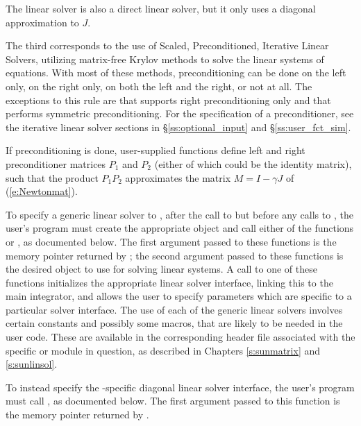 The {\cvdiag} linear solver is also a direct linear solver, but it
only uses a diagonal approximation to $J$.

The third corresponds to the use of Scaled, Preconditioned, Iterative
Linear Solvers, utilizing matrix-free Krylov methods to solve the
linear systems of equations.  With most of these methods,
preconditioning can be done on the left only, on the right only, on
both the left and the right, or not at all.  The exceptions to this
rule are {\spfgmr} that supports right preconditioning only and
{\pcg} that performs symmetric preconditioning.  For the specification
of a preconditioner, see the iterative linear solver sections
in \S\ref{ss:optional_input} and \S\ref{ss:user_fct_sim}.

If preconditioning is done, user-supplied functions define left and right
preconditioner matrices $P_1$ and $P_2$ (either of which could be the identity
matrix), such that the product $P_1 P_2$ approximates the matrix
$M = I - \gamma J$ of (\ref{e:Newtonmat}).

To specify a generic linear solver to {\cvode}, after the call to
 but before any calls to , the user's
program must create the appropriate {\sunlinsol} object and call
either of the functions  or
, as documented below.  The first argument
passed to these functions is the {\cvode} memory pointer returned by
; the second argument passed to these functions is the
desired {\sunlinsol} object to use for solving linear systems.  A call
to one of these functions initializes the appropriate {\cvode} linear
solver interface, linking this to the main {\cvode} integrator, and
allows the user to specify parameters which are specific to a
particular solver interface.
The use of each of the generic linear solvers involves certain
constants and possibly some macros, that are likely to be needed in
the user code.  These are available in the corresponding header file
associated with the specific {\sunmatrix} or {\sunlinsol} module in
question, as described in Chapters \ref{s:sunmatrix} and
\ref{s:sunlinsol}.

To instead specify the {\cvode}-specific diagonal linear solver
interface, the user's program must call , as documented
below.  The first argument passed to this function is the {\cvode}
memory pointer returned by .

